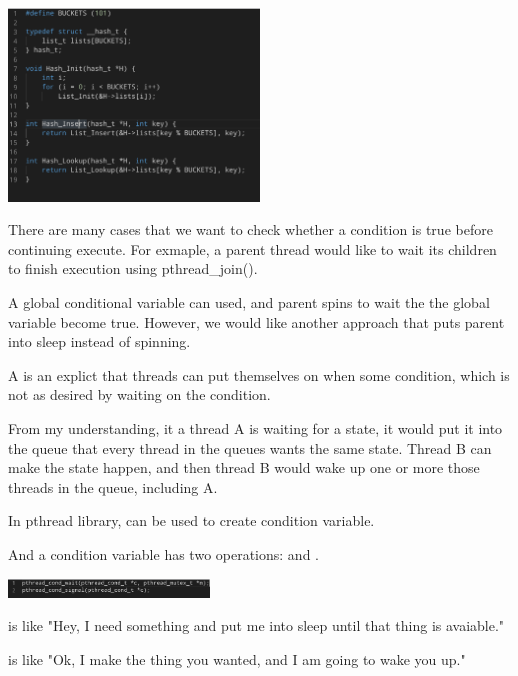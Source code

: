     \includegraphics[width=0.5\textwidth]{chapters/Cucurrency/Cucurrency/concurrent_hashtable.png}



    There are many cases that we want to check whether a condition is true before continuing execute. 
    For exmaple, a parent thread would like to wait its children to finish execution using pthread_join().

    A global conditional variable can used, and parent spins to wait the the global variable become true.
    However, we would like another approach that puts parent into sleep instead of spinning.


    A  is an explict  that threads can put themselves on 
    when some condition, which is not as desired by waiting on the condition.

    From my understanding, it a thread A is waiting for a state, it would put it into the queue that 
    every thread in the queues wants the same state. Thread B can make the state happen, and then thread 
    B would wake up one or more those threads in the queue, including A.


    In pthread library,  can be used to create condition variable. 
    
    And a condition variable has two operations:  and .

    \includegraphics[width=0.4\textwidth]{chapters/Cucurrency/Cucurrency/wait_signal.png}

     is like "Hey, I need something and put me into sleep until that thing is avaiable."

     is like "Ok, I make the thing you wanted, and I am going to wake you up."

